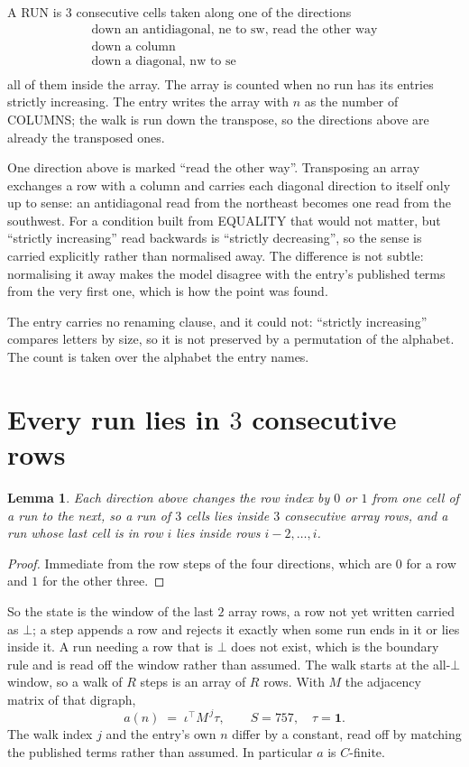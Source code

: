 \documentclass[11pt,a4paper]{article}
\theoremstyle{plain}
\newtheorem{lemma}[theorem]{Lemma}
\theoremstyle{definition}
\begin{document}
A RUN is $3$ consecutive cells taken along one of the directions
\[
\begin{array}{l}
\text{down an antidiagonal, ne to sw, read the other way} \\
\text{down a column} \\
\text{down a diagonal, nw to se} \\
\end{array}
\]
all of them inside the array. The array is counted when no run has its entries strictly increasing. The entry writes the array with $n$ as the number of COLUMNS; the walk is run down the transpose, so the directions above are already the transposed ones.


One direction above is marked ``read the other way''. Transposing an array exchanges a row with
a column and carries each diagonal direction to itself only up to sense: an antidiagonal read
from the northeast becomes one read from the southwest. For a condition built from EQUALITY
that would not matter, but ``strictly increasing'' read backwards is ``strictly decreasing'',
so the sense is carried explicitly rather than normalised away. The
difference is not subtle: normalising it away makes the model disagree with the entry's
published terms from the very first one, which is how the point was found.

The entry carries no renaming clause, and it could not: ``strictly increasing'' compares
letters by size, so it is not preserved by a permutation of the alphabet. The count is taken
over the alphabet the entry names.

\section{Every run lies in $3$ consecutive rows}

\begin{lemma}\label{lem:win}
Each direction above changes the row index by $0$ or $1$ from one cell of a run to the next, so
a run of $3$ cells lies inside $3$ consecutive array rows, and a run whose last cell is in
row $i$ lies inside rows $i-2,\dots,i$.
\end{lemma}

\begin{proof}
Immediate from the row steps of the four directions, which are $0$ for a row and $1$ for the
other three.
\end{proof}

So the state is the window of the last $2$ array rows, a row not yet written carried as
$\bot$; a step appends a row and rejects it exactly when some run ends in it or lies inside it.
A run needing a row that is $\bot$ does not exist, which is the boundary rule and is read off
the window rather than assumed. The walk starts at the all-$\bot$ window, so a walk of $R$ steps
is an array of $R$ rows. With $M$ the adjacency matrix of that digraph,
\[
a(n)\;=\;\iota^{\!\top}M^{\,j}\tau ,\qquad S=757,\quad\tau=\mathbf{1} .
\]
The walk index $j$ and the entry's own $n$ differ by a constant, read off by matching the
published terms rather than assumed. In particular $a$ is $C$-finite.
\end{document}
